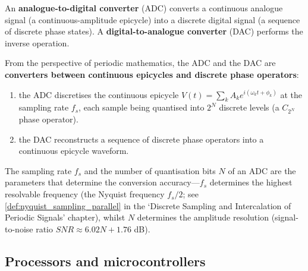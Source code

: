 \begin{definition}\label{def:adc_dac}
An \textbf{analogue-to-digital converter} (ADC) converts a continuous analogue signal (a continuous-amplitude epicycle) into a discrete digital signal (a sequence of discrete phase states). A \textbf{digital-to-analogue converter} (DAC) performs the inverse operation.

From the perspective of periodic mathematics, the ADC and the DAC are \textbf{converters between continuous epicycles and discrete phase operators}:
\begin{enumerate}[label=(\roman*)]
    \item the ADC discretises the continuous epicycle $V(t) = \sum_k A_k e^{i(\omega_k t + \phi_k)}$ at the sampling rate $f_s$, each sample being quantised into $2^N$ discrete levels (a $C_{2^N}$ phase operator).
    \item the DAC reconstructs a sequence of discrete phase operators into a continuous epicycle waveform.
\end{enumerate}
The sampling rate $f_s$ and the number of quantisation bits $N$ of an ADC are the parameters that determine the conversion accuracy---$f_s$ determines the highest resolvable frequency (the Nyquist frequency $f_s/2$; see \cref{def:nyquist_sampling_parallel} in the `Discrete Sampling and Intercalation of Periodic Signals' chapter), whilst $N$ determines the amplitude resolution (signal-to-noise ratio $SNR \approx 6.02N + 1.76$ dB).
\end{definition}

\subsection{Processors and microcontrollers}

